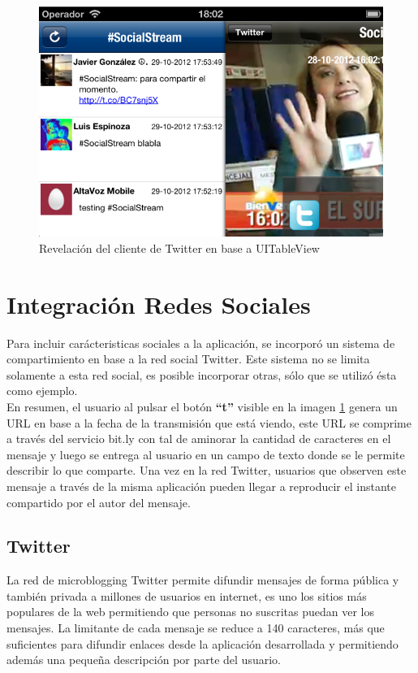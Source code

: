 \begin{figure}[H]
	\centering
	\includegraphics[scale=0.4]{imgs/sshot-twitterclientvc.png}
	\caption{Revelación del cliente de Twitter en base a UITableView}	
	\label{sshot-twitterclientvc}
\end{figure}
 
 
\section{Integración Redes Sociales}
	Para incluir carácteristicas sociales a la aplicación, se incorporó un sistema de compartimiento en base a la red social Twitter. Este sistema no se limita solamente a esta red social, es posible incorporar otras, sólo que se utilizó ésta como ejemplo.\\
	
	En resumen, el usuario al pulsar el botón \textbf{\textquotedblleft t\textquotedblright} visible en la imagen \ref{sshot-twitterclientvc} genera un URL en base a la fecha de la transmisión que está viendo, este URL se comprime a través del servicio bit.ly con tal de aminorar la cantidad de caracteres en el mensaje y luego se entrega al usuario en un campo de texto donde se le permite describir lo que comparte. Una vez en la red Twitter, usuarios que observen este mensaje a través de la misma aplicación pueden llegar a reproducir el instante compartido por el autor del mensaje.
	
	
	\subsection{Twitter}
	La red de microblogging Twitter permite difundir mensajes de forma pública y también privada a millones de usuarios en internet, es uno los sitios más populares de la web\cite{alexa-twitter} permitiendo que personas no suscritas puedan ver los mensajes.
	La limitante de cada mensaje se reduce a 140 caracteres, más que suficientes para difundir enlaces desde la aplicación desarrollada y permitiendo además una pequeña descripción por parte del usuario.
